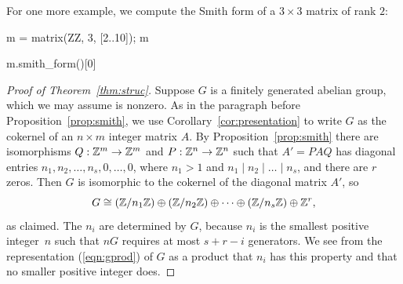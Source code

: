 \begin{example}
For one more example, we compute the Smith form of a
$3\times 3$ matrix of rank $2$:
\begin{sagecode}
\begin{sagecell}
m = matrix(ZZ, 3, [2..10]); m
\end{sagecell}
\begin{sageout}
[ 2  3  4]
[ 5  6  7]
[ 8  9 10]
\end{sageout}
\begin{sagecell}
m.smith_form()[0]
\end{sagecell}
\begin{sageout}
[1 0 0]
[0 3 0]
[0 0 0]
\end{sageout}
\end{sagecode}
\end{example}


\begin{proof}[Proof of Theorem~\ref{thm:struc}]
	Suppose $G$ is a finitely generated abelian group, which we may assume
	is nonzero.  As in the paragraph before Proposition~\ref{prop:smith},
	we use Corollary~\ref{cor:presentation} to write $G$ as the cokernel
	of an $n\times m$ integer matrix $A$.  By Proposition~\ref{prop:smith}
	there are isomorphisms $Q:\mathbb{Z}^m\to \mathbb{Z}^m$ and $P:\mathbb{Z}^n\to \mathbb{Z}^n$ such that
	$A'=PAQ$ has diagonal entries $n_1, n_2,\ldots,
	n_s,0,\ldots,0$, where $n_1>1$ and $n_1\mid n_2 \mid{} \ldots \mid{}
	n_s$, and there are $r$ zeros.  Then $G$ is isomorphic to the cokernel of the diagonal matrix
	$A'$, so
	\begin{equation}\label{eqn:gprod}
		G \cong (\mathbb{Z}/n_1\mathbb{Z}) \oplus (\mathbb{Z}/n_2\mathbb{Z})
		\oplus \cdots \oplus (\mathbb{Z}/n_s\mathbb{Z}) \oplus \mathbb{Z}^{r},
	\end{equation}
	as claimed.  The $n_i$ are determined by $G$, because $n_i$ is the
	smallest positive integer~$n$ such that $nG$ requires at most $s+r-i$
	generators. We see from the representation (\ref{eqn:gprod}) of $G$ as
	a product that $n_i$ has this property and that no smaller positive
	integer does.
\end{proof}

